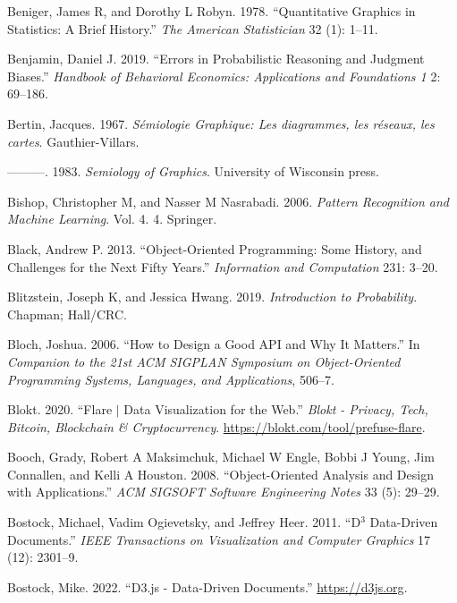 \documentclass[
  openany]{book}
\newlength{\cslhangindent}
\newenvironment{CSLReferences}[2] %
 {\begin{list}{}{%
  \setlength{\itemindent}{0pt}
  \setlength{\leftmargin}{0pt}
  \setlength{\parsep}{0pt}
  \ifodd #1
   \setlength{\leftmargin}{\cslhangindent}
   \setlength{\itemindent}{-1\cslhangindent}
  \fi
  \setlength{\itemsep}{#2\baselineskip}}}
 {\end{list}}
\theoremstyle{definition}
\theoremstyle{definition}
\theoremstyle{definition}
\theoremstyle{definition}
\theoremstyle{remark}
\begin{document}
\begin{CSLReferences}{1}{0}
Beniger, James R, and Dorothy L Robyn. 1978. {``Quantitative Graphics in Statistics: A Brief History.''} \emph{The American Statistician} 32 (1): 1--11.

Benjamin, Daniel J. 2019. {``Errors in Probabilistic Reasoning and Judgment Biases.''} \emph{Handbook of Behavioral Economics: Applications and Foundations 1} 2: 69--186.

Bertin, Jacques. 1967. \emph{{Sémiologie Graphique: Les diagrammes, les réseaux, les cartes}}. Gauthier-Villars.

---------. 1983. \emph{Semiology of Graphics}. University of Wisconsin press.

Bishop, Christopher M, and Nasser M Nasrabadi. 2006. \emph{Pattern Recognition and Machine Learning}. Vol. 4. 4. Springer.

Black, Andrew P. 2013. {``Object-Oriented Programming: Some History, and Challenges for the Next Fifty Years.''} \emph{Information and Computation} 231: 3--20.

Blitzstein, Joseph K, and Jessica Hwang. 2019. \emph{Introduction to Probability}. Chapman; Hall/CRC.

Bloch, Joshua. 2006. {``How to Design a Good API and Why It Matters.''} In \emph{Companion to the 21st ACM SIGPLAN Symposium on Object-Oriented Programming Systems, Languages, and Applications}, 506--7.

Blokt. 2020. {``Flare {\(\vert\)} Data Visualization for the Web.''} \emph{Blokt - Privacy, Tech, Bitcoin, Blockchain {\&} Cryptocurrency}. \url{https://blokt.com/tool/prefuse-flare}.

Booch, Grady, Robert A Maksimchuk, Michael W Engle, Bobbi J Young, Jim Connallen, and Kelli A Houston. 2008. {``Object-Oriented Analysis and Design with Applications.''} \emph{ACM SIGSOFT Software Engineering Notes} 33 (5): 29--29.

Bostock, Michael, Vadim Ogievetsky, and Jeffrey Heer. 2011. {``D\(^3\) Data-Driven Documents.''} \emph{IEEE Transactions on Visualization and Computer Graphics} 17 (12): 2301--9.

Bostock, Mike. 2022. {``D3.js - Data-Driven Documents.''} \url{https://d3js.org}.


\end{CSLReferences}
\end{document}
